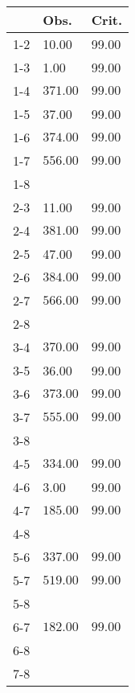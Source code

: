 \begin{table}[ht]
\centering
\begin{tabular}{rll}
  \hline
 & Obs. & Crit. \\ 
  \hline
1-2 & 10.00 & 99.00 \\ 
  1-3 & 1.00 & 99.00 \\ 
  1-4 & \(\mathbf{371.00}\) & \(\mathbf{99.00}\) \\ 
  1-5 & 37.00 & 99.00 \\ 
  1-6 & \(\mathbf{374.00}\) & \(\mathbf{99.00}\) \\ 
  1-7 & \(\mathbf{556.00}\) & \(\mathbf{99.00}\) \\ 
  1-8 &  &  \\ 
  2-3 & 11.00 & 99.00 \\ 
  2-4 & \(\mathbf{381.00}\) & \(\mathbf{99.00}\) \\ 
  2-5 & 47.00 & 99.00 \\ 
  2-6 & \(\mathbf{384.00}\) & \(\mathbf{99.00}\) \\ 
  2-7 & \(\mathbf{566.00}\) & \(\mathbf{99.00}\) \\ 
  2-8 &  &  \\ 
  3-4 & \(\mathbf{370.00}\) & \(\mathbf{99.00}\) \\ 
  3-5 & 36.00 & 99.00 \\ 
  3-6 & \(\mathbf{373.00}\) & \(\mathbf{99.00}\) \\ 
  3-7 & \(\mathbf{555.00}\) & \(\mathbf{99.00}\) \\ 
  3-8 &  &  \\ 
  4-5 & \(\mathbf{334.00}\) & \(\mathbf{99.00}\) \\ 
  4-6 & 3.00 & 99.00 \\ 
  4-7 & \(\mathbf{185.00}\) & \(\mathbf{99.00}\) \\ 
  4-8 &  &  \\ 
  5-6 & \(\mathbf{337.00}\) & \(\mathbf{99.00}\) \\ 
  5-7 & \(\mathbf{519.00}\) & \(\mathbf{99.00}\) \\ 
  5-8 &  &  \\ 
  6-7 & \(\mathbf{182.00}\) & \(\mathbf{99.00}\) \\ 
  6-8 &  &  \\ 
  7-8 &  &  \\ 
   \hline
\end{tabular}
\end{table}
